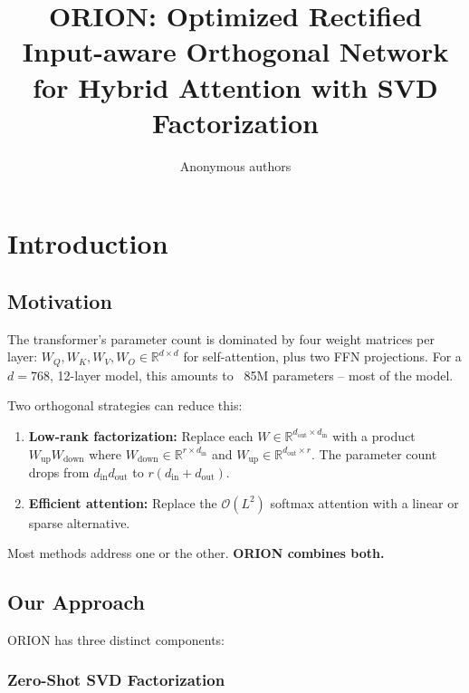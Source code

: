 \title{\textbf{ORION: Optimized Rectified Input-aware Orthogonal Network for Hybrid Attention with SVD Factorization}}

\author{Anonymous authors}



\section{Introduction}

\subsection{Motivation}

The transformer's parameter count is dominated by four weight matrices 
per layer: $W_Q, W_K, W_V, W_O \in \mathbb{R}^{d \times d}$ for self-attention, 
plus two FFN projections. For a $d = 768$, 12-layer model, this amounts 
to ~85M parameters -- most of the model.

Two orthogonal strategies can reduce this:

\begin{enumerate}
\item \textbf{Low-rank factorization:} Replace each $W \in \mathbb{R}^{d_\text{out} \times d_\text{in}}$
  with a product $W_\text{up} W_\text{down}$ where $W_\text{down} \in \mathbb{R}^{r \times d_\text{in}}$
  and $W_\text{up} \in \mathbb{R}^{d_\text{out} \times r}$. The parameter
  count drops from $d_\text{in} d_\text{out}$ to $r(d_\text{in} + d_\text{out})$.

\item \textbf{Efficient attention:} Replace the $\mathcal{O}(L^2)$ softmax attention
  with a linear or sparse alternative.

\end{enumerate}
Most methods address one or the other. \textbf{ORION combines both.}

\subsection{Our Approach}

ORION has three distinct components:

\subsubsection{Zero-Shot SVD Factorization}

